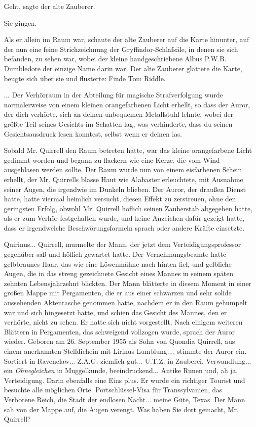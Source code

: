 \glqq Geht\grqq{}, sagte der alte Zauberer.

Sie gingen.

Als er allein im Raum war, schaute der alte Zauberer auf die Karte hinunter, auf
der nun eine feine Strichzeichnung der Gryffindor-Schlafsäle, in denen sie sich
befanden, zu sehen war, wobei der kleine handgeschriebene Albus P.W.B.
Dumbledore der einzige Name darin war. Der alte Zauberer glättete die Karte,
beugte sich über sie und flüsterte: \glqq Finde Tom Riddle.\grqq{}


... Der Verhörraum in der Abteilung für magische Strafverfolgung wurde
normalerweise von einem kleinen orangefarbenen Licht erhellt, so dass der Auror,
der dich verhörte, sich an deinen unbequemen Metallstuhl lehnte, wobei der
größte Teil seines Gesichts im Schatten lag, was verhinderte, dass du seinen
Gesichtsausdruck lesen konntest, selbst wenn er deinen las.

Sobald Mr. Quirrell den Raum betreten hatte, war das kleine orangefarbene Licht
gedimmt worden und begann zu flackern wie eine Kerze, die vom Wind ausgeblasen
werden sollte. Der Raum wurde nun von einem eisfarbenen Schein erhellt, der Mr.
Quirrells blasse Haut wie Alabaster erleuchtete, mit Ausnahme seiner Augen, die
irgendwie im Dunkeln blieben. Der Auror, der draußen Dienst hatte, hatte viermal
heimlich versucht, diesen Effekt zu zerstreuen, ohne den geringsten Erfolg,
obwohl Mr. Quirrell höflich seinen Zauberstab abgegeben hatte, als er zum Verhör
festgehalten wurde, und keine Anzeichen dafür gezeigt hatte, dass er
irgendwelche Beschwörungsformeln sprach oder andere Kräfte einsetzte.

\glqq Quirinus... Quirrell\grqq{}, murmelte der Mann, der jetzt dem
Verteidigungsprofessor gegenüber saß und höflich gewartet hatte. Der
Vernehmungsbeamte hatte gelbbraunes Haar, das wie eine Löwenmähne nach hinten
fiel, und gelbliche Augen, die in das streng gezeichnete Gesicht eines Mannes in
seinem späten zehnten Lebensjahrzehnt blickten. Der Mann blätterte in diesem
Moment in einer großen Mappe mit Pergamenten, die er aus einer schwarzen und
sehr solide aussehenden Aktentasche genommen hatte, nachdem er in den Raum
gehumpelt war und sich hingesetzt hatte, und schien das Gesicht des Mannes, den
er verhörte, nicht zu sehen. Er hatte sich nicht vorgestellt. Nach einigem
weiteren Blättern in Pergamenten, das schweigend vollzogen wurde, sprach der
Auror wieder. \glqq Geboren am 26. September 1955 als Sohn von Quondia Quirrell,
aus einem anerkannten Stelldichein mit Lirinus Lumblung...\grqq{}, stimmte der
Auror ein. \glqq Sortiert in Ravenclaw... Z.A.G. ziemlich gut... U.T.Z. in
Zauberei, Verwandlung... ein \emph{Ohnegleichen} in Muggelkunde,
beeindruckend... Antike Runen und, ah ja, Verteidigung. Darin ebenfalls eine
Eins plus. Er wurde ein richtiger Tourist und besuchte alle möglichen Orte.
Portschlüssel-Visa für Transsylvanien, das Verbotene Reich, die Stadt der
endlosen Nacht... meine Güte, Texas.\grqq{} Der Mann sah von der Mappe auf, die
Augen verengt. \glqq Was haben Sie dort gemacht, Mr. Quirrell?\grqq{}

